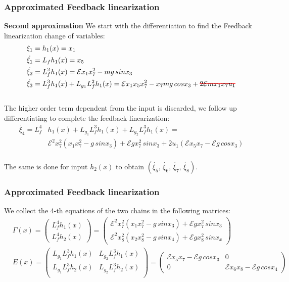 \begin{frame}
\frametitle{Approximated Feedback linearization}
\textbf{Second approximation}\newline
We start with the differentiation to find the Feedback linearization change of variables:
\begin{equation*}
\begin{aligned}
&\xi_1 = h_1(x) = x_1 \\
&\dot{\xi_1} = L_fh_1(x) = x_5 \\
&\dot{\xi_2} = L^2_fh_1(x) = \mathcal{E}x_1x^2_7 - mg\,sinx_3 \\
&\dot{\xi_3} = L^3_fh_1(x) + L_{g_1}L^2_fh_1(x) = \mathcal{E}x_1x_5x^2_7 - x_7mg\,cosx_3 + \hcancel[red]{2\mathcal{E}mx_1x_7u_1}
\end{aligned}
\end{equation*}\\[8pt]
The higher order term dependent from the input is discarded, we follow up differentiating to complete the feedback linearization:
\begin{equation*}
\begin{aligned}
\dot{\xi_4} = L^4_f&h_1(x) + L_{g_1}L^3_fh_1(x) + L_{g_2}L^3_fh_1(x) = \\
&\mathcal{E}^2x^2_7(x_1x^2_7 - g\,sinx_3) + \mathcal{E}gx^2_7\,sinx_3 + 2u_1(\mathcal{E}x_5x_7 - \mathcal{E}g\,cosx_3)
\end{aligned}
\end{equation*}\\[8pt]
The same is done for input $h_2(x)$ to obtain $\left(\dot{\xi_5},\,\dot{\xi_6},\,\dot{\xi_7},\,\dot{\xi_8}\right)$.
\end{frame}
%
\begin{frame}
\frametitle{Approximated Feedback linearization}
We collect the 4-th equations of the two chains in the following matrices:
\begin{align}
 	&\Gamma(x) =%
 	\begin{pmatrix}
 		L^4_fh_1(x)\\
 		L^4_fh_2(x)
 	\end{pmatrix}=%
 	\begin{pmatrix}
 		\mathcal{E}^2x^2_7(x_1x^2_7 - g\,sinx_3) + \mathcal{E}gx^2_7\,sinx_3 \\
 		\mathcal{E}^2x^2_8(x_2x^2_8 - g\,sinx_4) + \mathcal{E}gx^2_8\,sinx_x
 	\end{pmatrix}\nonumber\\[8pt]
 	&E(x)=%
 	\begin{pmatrix}
 		L_{g_1}L^3_fh_1(x) &L_{g_2}L^3_fh_1(x) \\
 		L_{g_1}L^3_fh_2(x) &L_{g_2}L^3_fh_2(x) \\
 	\end{pmatrix}=%
 	\begin{pmatrix}
 		\mathcal{E}x_5x_7 - \mathcal{E}g\,cosx_3 &0\\
 		0 &\mathcal{E}x_6x_8 - \mathcal{E}g\,cosx_4
 	\end{pmatrix}\nonumber
\end{align}\\[8pt]
\end{frame}
